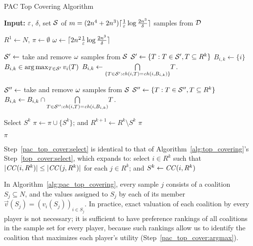 \begin{algorithm}[htb]
  \caption{PAC Top Covering Algorithm}
  \label{alg:pac_top_covering}
  \textbf{Input:} $\eps$, $\delta$, set $\cal S$ of $m = (2n^4 + 2n^3)\ceil{\frac{1}{\eps}\log\frac{2n^3}{\delta}}$ samples from $\cal D$
  \begin{algorithmic}[1]

  \State $R^1 \gets N$, $\pi \gets \emptyset$
  \State $\samples \gets \ceil{2n^2 \frac{1}{\eps}\log\frac{2n^3}{\delta}}$

    \State \label{pac_top_cover:sample_begin} $\cal S' \gets$ take and remove $\samples$ samples from $\cal S$
    \State $\cal S' \gets \{T: T \in \cal S', T \subseteq R^k\}$
        \State$B_{i,k} \gets \{i\}$
      \Else
        \State \label{pac_top_cover:argmax} $B_{i,k} \in \arg\max_{T \in \cal S'}{v_i(T)}$
        \State $B_{i,k} \gets \underset{\{T \in \cal S' : \ch(i,T) = \ch(i,B_{i,k})\}}{\bigcap} T$.
      \EndIf
    \EndFor

      \State $\cal S'' \gets$ take and remove $\samples$ samples from $\cal S$
      \State $\cal S'' \gets \{T: T \in \cal S'', T \subseteq R^k\}$
        \State $B_{i,k} \gets B_{i,k} \cap \underset{T \in \cal S'' : \ch(i,T) = \ch(i,B_{i,k})}{\bigcap} T$.
      \EndFor
    \EndFor \label{pac_top_cover:sample_end}

    \State \label{pac_top_cover:select} Select $S^k$
    \State $\pi \leftarrow  \pi \cup \lbrace S^k \rbrace$; and $R^{k+1} \leftarrow  R^k \setminus S^k$
      \State \Return $\pi$
    \EndIf
  \EndFor

  \State \Return $\pi$
 \end{algorithmic}
\end{algorithm}

Step~\ref{pac_top_cover:select} is identical to that of
Algorithm~\ref{alg:top_covering}'s Step~\ref{top_cover:select}, which expands to:
select $i\in R^k$ such that $|\CC(i,R^k)| \leq |\CC(j,R^k)|$ for each $j\in R^k$;
and $S^k\leftarrow \CC(i,R^k)$

In Algorithm~\ref{alg:pac_top_covering}, every sample $j$ consists of a coalition
$S_j \subseteq N$, and the values assigned to $S_j$ by each of its member
$\vec{v}(S_j) = (v_i(S_j))_{i \in S_j}$.
In practice, exact valuation of each coalition by every player is not necessary;
it is sufficient to have preference rankings of all coalitions in the sample set
for every player, because such rankings allow us to identify the coalition that
maximizes each player's utility (Step~\ref{pac_top_cover:argmax}).


